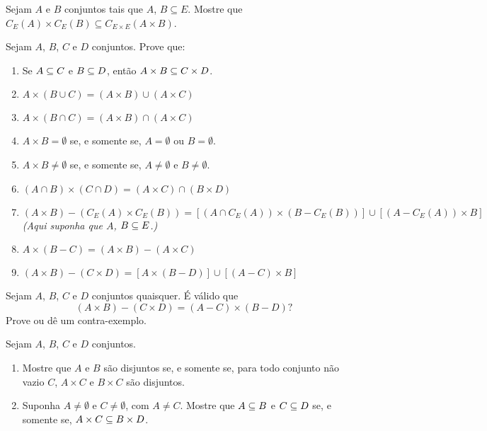 \documentclass[12pt]{exam}
\begin{document}
\newpage

\questao{} Sejam $A$ e $B$ conjuntos tais que $A$, $B \subseteq E$. Mostre que $C_E(A) \times C_E(B) \subseteq C_{E \times E}(A \times B)$.

\vspace{.3cm}

\questao{} Sejam $A$, $B$, $C$ e $D$ conjuntos. Prove que:
\begin{enumerate}[label={\alph*})]
    \item Se $A \subseteq C$ e $B \subseteq D$, ent\~ao $A \times B \subseteq C \times D$.

    \item $A \times (B \cup C) = (A \times B) \cup (A \times C)$

    \item $A \times (B \cap C) = (A \times B) \cap (A \times C)$

    \item $A \times B = \emptyset$ se, e somente se, $A = \emptyset$ ou $B = \emptyset$.

    \item $A \times B \ne \emptyset$ se, e somente se, $A \ne \emptyset$ e $B \ne \emptyset$.

    \item $(A \cap B) \times (C \cap D) = (A \times C) \cap (B \times D)$

    \item $(A \times B) - (C_E(A) \times C_E(B)) = [(A \cap C_E(A)) \times (B - C_E(B))] \cup [(A - C_E(A)) \times B]$  \textit{(Aqui suponha que $A$, $B \subseteq E$.)}

    \item $A \times (B - C) = (A \times B) - (A \times C)$

    \item $(A \times B) - (C \times D) = [A \times (B - D)] \cup [(A - C) \times B]$
\end{enumerate}

\vspace{.3cm}

\questao{} Sejam $A$, $B$, $C$ e $D$ conjuntos quaisquer. É válido que
\[
    (A \times B) - (C \times D) = (A - C) \times (B - D)?
\]
Prove ou dê um contra-exemplo.

\vspace{.3cm}

\questao{} Sejam $A$, $B$, $C$ e $D$ conjuntos.
\begin{enumerate}[label={\alph*})]
    \item Mostre que $A$ e $B$ s\~ao disjuntos se, e somente se, para todo conjunto n\~ao vazio $C$, $A \times C$ e $B \times C$ s\~ao disjuntos.

    \item Suponha $A \ne \emptyset$ e $C \ne \emptyset$, com $A \ne C$. Mostre que $A \subseteq B$ e $C \subseteq D$ se, e somente se, $A \times C \subseteq B \times D$.
\end{enumerate}
\end{document}
